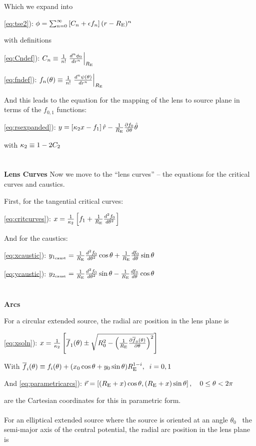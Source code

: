 Which we expand into

\eqref{eq:tse2}): $\phi  = \sum_{n=0}^\infty \left[ C_n + \epsilon f_n  \right] (r-R_{\mathrm{E}})^n$

with definitions

\eqref{eq:Cndef}): $C_n \equiv {1 \over n!} \left. {d^n \phi_0 \over dr^n }\right|_{R_{\mathrm{E}}}$

\eqref{eq:fndef}): $f_n(\theta) \equiv  {1 \over n!} \left. {d^n \psi(\theta) \over dr^n }\right|_{R_{\mathrm{E}}}$

And this leads to the equation for the mapping of the lens to source plane in terms of the $f_{0,1}$ functions:

\eqref{eq:rsexpanded}):  $y = \left[ \kappa_2 x - f_1 \right] \hat{r} - {1 \over R_{\mathrm{E}}} {\partial f_0 \over \partial \theta}  \hat{\theta}$

with  $\kappa_2 \equiv 1-2 C_2$
\\
\\
\\
{\bf Lens Curves}
Now we move to the ``lens curves'' -- the equations for the critical curves and caustics.

First, for the tangential critical curves:

\eqref{eq:critcurves}): $x=\frac{1}{\kappa_2}\left[f_1+\frac{1}{R_{\mathrm{E}}}\frac{d^2f_0}{d\theta^2}\right] \label{xte}$

And for the caustics:

\eqref{eq:xcaustic}): $y_{1_\mathrm{caust}} = \frac{1}{R_{\mathrm{E}}}\frac{d^2f_0}{d\theta^2}\cos{\theta}+\frac{1}{R_{\mathrm{E}}}\frac{df_0}{d\theta}\sin{\theta}$

\eqref{eq:ycaustic}): $y_{2_\mathrm{caust}} = \frac{1}{R_{\mathrm{E}}}\frac{d^2f_0}{d\theta^2}\sin{\theta}-\frac{1}{R_{\mathrm{E}}}\frac{df_0}{d\theta}\cos{\theta}$
\\
\\
\\
{\bf Arcs}

For a circular extended source, the radial arc position in the lens plane is

\eqref{eq:xsoln}):  $x = \frac{1}{\kappa_2}\left[ \overline{f}_{1}(\theta) \pm \sqrt{R_0^2 - \left( \frac{1}{R_{\mathrm{E}}}\frac{\partial \overline{f}_0(\theta)}{\partial \theta} \right)^2} \right] $

With $\overline{f}_i(\theta) \equiv f_i(\theta) + (x_0 \cos \theta + y_0 \sin \theta)R_{\mathrm{E}}^{1-i}, \;\; i=0,1 $

And
\eqref{eq:parametricarcs}): $\vec{r}= \left[(R_{\mathrm{E}} +x)\cos{\theta},(R_{\mathrm{E}}+x)\sin{\theta}\right], \quad 0 \leq \theta < 2\pi$

are the Cartesian coordinates for this in parametric form.
\\
\\
For an elliptical extended source where the source is oriented at an angle $\theta_0$ \wrt\ the semi-major axis of the central potential, the radial arc position in the lens plane is

